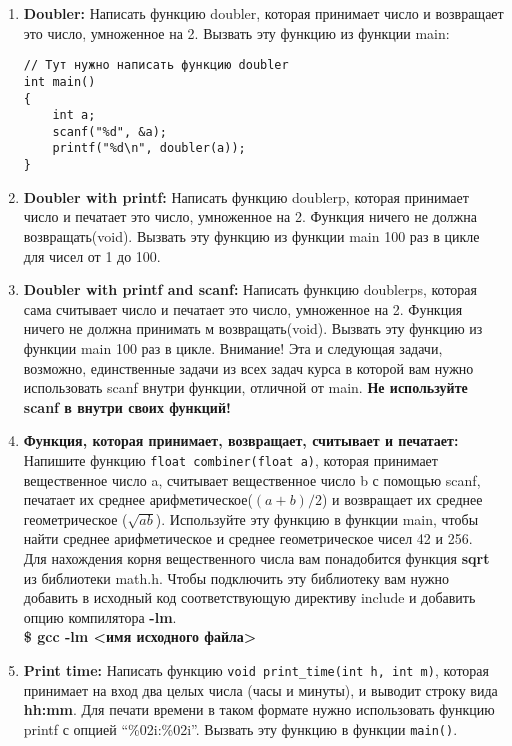 \documentclass{article}
\begin{document}
\begin{enumerate}
\newpage
\item \textbf{Doubler:} Написать функцию doubler, которая принимает число и возвращает это число, умноженное на 2. Вызвать эту функцию из функции main:
\begin{lstlisting}
// Тут нужно написать функцию doubler
int main()
{
	int a;
	scanf("%d", &a);
	printf("%d\n", doubler(a));
}
\end{lstlisting}

\item \textbf{Doubler with printf:} Написать функцию doublerp, которая принимает число и печатает это число, умноженное на 2. Функция ничего не должна возвращать(void). Вызвать эту функцию из функции main 100 раз в цикле для чисел от 1 до 100.

\item \textbf{Doubler with printf and scanf:} Написать функцию doublerps, которая сама считывает число и печатает это число, умноженное на 2. Функция ничего не должна принимать м возвращать(void). Вызвать эту функцию из функции main 100 раз в цикле. Внимание! Эта и следующая задачи, возможно, единственные задачи из всех задач курса в которой вам нужно использовать scanf внутри функции, отличной от main. \textbf{Не используйте scanf в внутри своих функций!}

\item \textbf{Функция, которая принимает, возвращает, считывает и печатает:} Напишите функцию \texttt{float combiner(float a)}, которая принимает вещественное число a, считывает вещественное число b с помощью scanf, печатает их среднее арифметическое($(a+b)/2$) и возвращает их среднее геометрическое ($\sqrt{a b}$). Используйте эту функцию в функции main, чтобы найти среднее арифметическое и среднее геометрическое чисел 42 и 256. \\ Для нахождения корня вещественного числа вам понадобится функция \textbf{sqrt} из библиотеки math.h. Чтобы подключить эту библиотеку вам нужно добавить в исходный код соответствующую директиву include и добавить опцию компилятора \textbf{-lm}. \\ \textbf{\$ gcc -lm <имя исходного файла>}

\item \textbf{Print time:} Написать функцию \texttt{void print\_time(int h, int m)}, которая принимает на вход два целых числа (часы и минуты), и выводит строку вида \textbf{hh:mm}. Для печати времени в таком формате нужно использовать функцию printf с опцией ``\%02i:\%02i''. Вызвать эту функцию в функции \texttt{main()}.


\end{enumerate}
\end{document}
